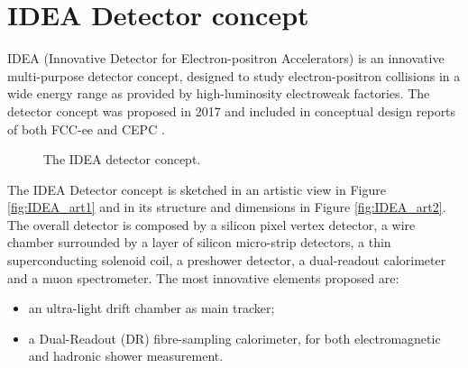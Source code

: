 \section{IDEA Detector concept} \label{sec:Idea_project}
IDEA (Innovative Detector for Electron-positron Accelerators) is an innovative multi-purpose detector concept, designed to study electron-positron collisions in a wide energy range as provided by high-luminosity electroweak factories.
The detector concept was proposed in 2017 and included in conceptual design reports of both FCC-ee \cite{FCC-ee_design} and CEPC \cite{CEPC_design}.

\begin{figure}
	\centering
	 \quad
	\caption{The IDEA detector concept.}
\end{figure}

The IDEA Detector concept is sketched in an artistic view in Figure \ref{fig:IDEA_art1} and in its structure and dimensions in Figure \ref{fig:IDEA_art2}. 
The overall detector is composed by a silicon pixel vertex detector, a wire chamber surrounded by a layer of silicon micro-strip detectors, a thin superconducting solenoid coil, a preshower detector, a dual-readout calorimeter and a muon spectrometer.
The most innovative elements proposed are:
\begin{itemize}
  \item an ultra-light drift chamber as main tracker;
  \item a Dual-Readout (DR) fibre-sampling calorimeter, for both electromagnetic and hadronic shower measurement.
\end{itemize}

